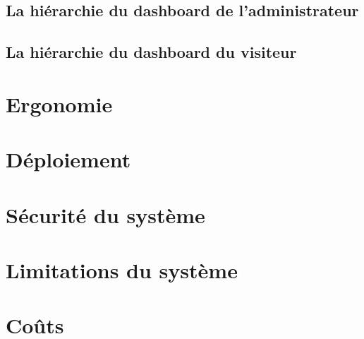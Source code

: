         \subsection{La hiérarchie du dashboard de l'administrateur}
        
        \subsection{La hiérarchie du dashboard du visiteur}


        \section{Ergonomie}
        \lipsum[1]
        \section{Déploiement}
        \lipsum[1]
        \section{Sécurité du système}
        \lipsum[1]
        \section{Limitations du système}
        \lipsum[1]
        \section{Coûts}
        \lipsum[1]
    
